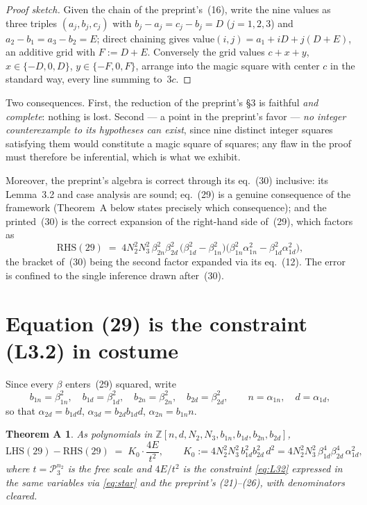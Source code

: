 \documentclass[11pt]{amsart}
\newtheorem*{thmA}{Theorem A}
\theoremstyle{remark}
\newcommand{\Z}{\mathbb{Z}}
\newcommand{\cP}{\mathcal{P}}
\begin{document}
\begin{proof}[Proof sketch]
Given the chain of the preprint's~(16), write the nine values as three
triples $(a_j, b_j, c_j)$ with $b_j - a_j = c_j - b_j = D$ ($j = 1, 2,
3$) and $a_2 - b_1 = a_3 - b_2 = E$; direct chaining gives value$(i,j)
= a_1 + iD + j(D + E)$, an additive grid with $F := D + E$. Conversely
the grid values $c + x + y$, $x \in \{-D, 0, D\}$, $y \in \{-F, 0,
F\}$, arrange into the magic square with center $c$ in the standard
way, every line summing to~$3c$.
\end{proof}

Two consequences. First, the reduction of the preprint's \S3 is
faithful \emph{and complete}: nothing is lost. Second --- a point in
the preprint's favor --- \emph{no integer counterexample to its
hypotheses can exist}, since nine distinct integer squares satisfying
them would constitute a magic square of squares; any flaw in the proof
must therefore be inferential, which is what we exhibit.

Moreover, the preprint's algebra is correct through its eq.~(30)
inclusive: its Lemma~3.2 and case analysis are sound; eq.~(29) is a
genuine consequence of the framework (Theorem~A below states precisely
which consequence); and the printed~(30) is the correct expansion of
the right-hand side of~(29), which factors as
\begin{equation}\label{eq:factored}
\mathrm{RHS}(29) \;=\; 4N_2^2N_3^2\,\beta_{2n}^2\beta_{2d}^2\,
\bigl(\beta_{1d}^2-\beta_{1n}^2\bigr)
\bigl(\beta_{1n}^2\alpha_{1n}^2 - \beta_{1d}^2\alpha_{1d}^2\bigr),
\end{equation}
the bracket of~(30) being the second factor expanded via its
eq.~(12). The error is confined to the single inference drawn
after~(30).

\section{Equation (29) is the constraint (L3.2) in costume}
\label{sec:thmA}

Since every $\beta$ enters~(29) squared, write
\begin{equation*}
b_{1n} = \beta_{1n}^2, \quad b_{1d} = \beta_{1d}^2, \quad
b_{2n} = \beta_{2n}^2, \quad b_{2d} = \beta_{2d}^2, \qquad
n = \alpha_{1n}, \quad d = \alpha_{1d},
\end{equation*}
so that $\alpha_{2d} = b_{1d}d$, $\alpha_{3d} = b_{2d}b_{1d}d$,
$\alpha_{2n} = b_{1n}n$.

\begin{thmA}
As polynomials in $\Z[n, d, N_2, N_3, b_{1n}, b_{1d}, b_{2n},
b_{2d}]$,
\begin{equation*}
\mathrm{LHS}(29) - \mathrm{RHS}(29) \;=\; K_0 \cdot \frac{4E}{t^2},
\qquad
K_0 := 4N_2^2N_3^2\,b_{1d}^2 b_{2d}^2\,d^2
 = 4N_2^2N_3^2\,\beta_{1d}^4\beta_{2d}^4\,\alpha_{1d}^2,
\end{equation*}
where $t = \cP_3^{n_2}$ is the free scale and $4E/t^2$ is the
constraint \eqref{eq:L32} expressed in the same variables via
\eqref{eq:star} and the preprint's (21)--(26), with denominators
cleared.
\end{thmA}
\end{document}
